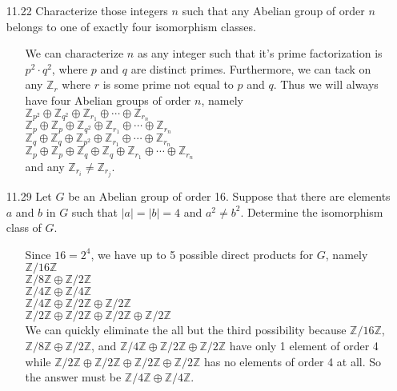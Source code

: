 \documentclass[12pt]{article}
\begin{document}
\begin{enumerate}
\item[11.22] Characterize those integers $n$ such that any Abelian group of order $n$ belongs
to one of exactly four isomorphism classes.
\begin{enumerate}
\item[] We can characterize $n$ as any integer such that it's prime factorization is $p^2 \cdot q^2$, where
$p$ and $q$ are distinct primes. Furthermore, we can tack on any $\mathbb{Z}_r$ where $r$ is some prime
not equal to $p$ and $q$. Thus we will always have four Abelian groups of order $n$, namely \\
$\mathbb{Z}_{p^2} \oplus \mathbb{Z}_{q^2} \oplus \mathbb{Z}_{r_1} \oplus \cdots \oplus \mathbb{Z}_{r_n}$ \\
$\mathbb{Z}_p \oplus \mathbb{Z}_p \oplus \mathbb{Z}_{q^2} \oplus \mathbb{Z}_{r_1} \oplus \cdots \oplus \mathbb{Z}_{r_n}$ \\
$\mathbb{Z}_q \oplus \mathbb{Z}_q \oplus \mathbb{Z}_{p^2} \oplus \mathbb{Z}_{r_1} \oplus \cdots \oplus \mathbb{Z}_{r_n}$ \\
$\mathbb{Z}_p \oplus \mathbb{Z}_p \oplus \mathbb{Z}_q \oplus \mathbb{Z}_q \oplus \mathbb{Z}_{r_1} \oplus \cdots \oplus \mathbb{Z}_{r_n}$ \\
and any $\mathbb{Z}_{r_i} \neq \mathbb{Z}_{r_j}$.
\end{enumerate}

\item[11.29] Let $G$ be an Abelian group of order 16. Suppose that there are elements $a$ and $b$ in $G$ such that
$|a| = |b| = 4$ and $a^2 \neq b^2$. Determine the isomorphism class of $G$.
\begin{enumerate}
\item[] Since $16 = 2^4$, we have up to 5 possible direct products for $G$, namely \\
$\mathbb{Z}/16\mathbb{Z}$ \\
$\mathbb{Z}/8\mathbb{Z} \oplus \mathbb{Z}/2\mathbb{Z}$ \\
$\mathbb{Z}/4\mathbb{Z} \oplus \mathbb{Z}/4\mathbb{Z}$ \\
$\mathbb{Z}/4\mathbb{Z} \oplus \mathbb{Z}/2\mathbb{Z} \oplus \mathbb{Z}/2\mathbb{Z}$ \\
$\mathbb{Z}/2\mathbb{Z} \oplus \mathbb{Z}/2\mathbb{Z} \oplus \mathbb{Z}/2\mathbb{Z} \oplus 
\mathbb{Z}/2\mathbb{Z}$ \\
We can quickly eliminate the all but the third possibility because $\mathbb{Z}/16\mathbb{Z}$, \\
$\mathbb{Z}/8\mathbb{Z} \oplus \mathbb{Z}/2\mathbb{Z}$, and $\mathbb{Z}/4\mathbb{Z} 
\oplus \mathbb{Z}/2\mathbb{Z} \oplus \mathbb{Z}/2\mathbb{Z}$ 
have only 1 element of order 4 while 
$\mathbb{Z}/2\mathbb{Z} \oplus \mathbb{Z}/2\mathbb{Z} \oplus \mathbb{Z}/2\mathbb{Z} \oplus 
\mathbb{Z}/2\mathbb{Z}$ has no elements of order 4 at all. So the answer must be 
$\mathbb{Z}/4\mathbb{Z} \oplus \mathbb{Z}/4\mathbb{Z}$.
\end{enumerate}


\end{enumerate}
\end{document}
